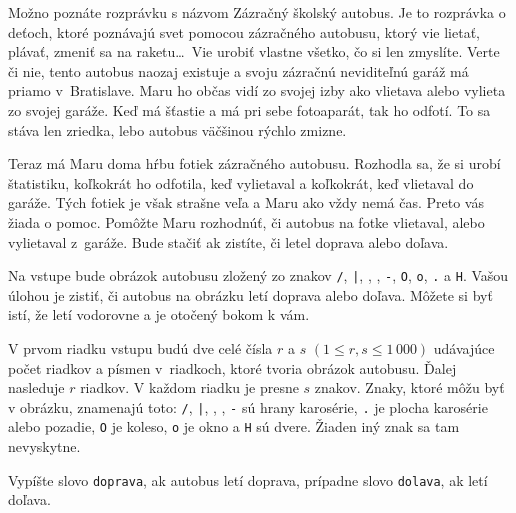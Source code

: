 





Možno poznáte rozprávku s názvom Zázračný školský autobus.
Je to rozprávka o deťoch, ktoré poznávajú svet pomocou zázračného autobusu,
ktorý vie lietať, plávať, zmeniť sa na raketu\dots\ Vie urobiť vlastne všetko,
čo si len zmyslíte. Verte či nie, tento autobus naozaj existuje
a svoju zázračnú neviditeľnú garáž má priamo v~Bratislave.
Maru ho občas vidí zo svojej izby ako vlietava alebo vylieta zo svojej garáže.
Keď má šťastie a má pri sebe fotoaparát, tak ho odfotí.
To sa stáva len zriedka, lebo autobus väčšinou rýchlo zmizne.

Teraz má Maru doma hŕbu fotiek zázračného autobusu. Rozhodla sa, že si urobí štatistiku,
koľkokrát ho odfotila, keď vylietaval a koľkokrát, keď vlietaval do garáže.
Tých fotiek je však strašne veľa a Maru ako vždy nemá čas. Preto vás žiada o pomoc.
Pomôžte Maru rozhodnúť, či autobus na fotke vlietaval, alebo vylietaval z~garáže.
Bude stačiť ak zistíte, či letel doprava alebo doľava.


\newcommand{\bs}{\symbol{`\\}}
\newcommand{\us}{\symbol{`_}}

Na vstupe bude obrázok autobusu zložený zo znakov
\texttt{/}, \texttt{|}, \texttt{\bs}, \texttt{\us}, \texttt{-}, \texttt{O}, \texttt{o}, \texttt{.}  
a \texttt{H}.
Vašou úlohou je zistiť, či autobus na obrázku letí doprava alebo doľava.
Môžete si byť istí, že letí vodorovne a je otočený bokom k vám.


V prvom riadku vstupu budú dve celé čísla $r$ a $s$ $(1 \leq r,s \leq 1\,000)$
udávajúce počet riadkov a písmen v~riadkoch, ktoré tvoria obrázok autobusu.
Ďalej nasleduje $r$ riadkov. V každom riadku je presne $s$ znakov.
Znaky, ktoré môžu byť v obrázku, znamenajú toto: \texttt{/}, \texttt{|}, \texttt{\bs},
\texttt{\us}, \texttt{-}  sú hrany karosérie, \texttt{.} je plocha karosérie alebo pozadie,
\texttt{O} je koleso, \texttt{o} je okno a \texttt{H} sú dvere.
Žiaden iný znak sa tam nevyskytne.


Vypíšte slovo \texttt{doprava}, ak autobus letí doprava, prípadne slovo \texttt{dolava}, ak letí doľava.



